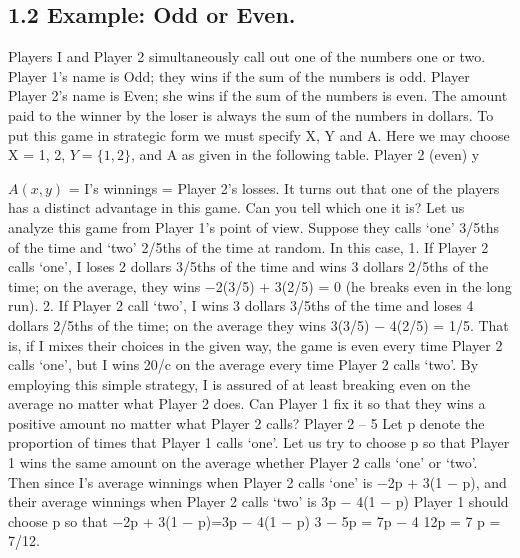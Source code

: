 \documentclass[]{report}
\begin{document}
\subsection{1.2 Example: Odd or Even.} Players I and Player 2 simultaneously call out one of the
numbers one or two. Player 1’s name is Odd; they wins if the sum of the numbers is odd.
Player Player 2’s name is Even; she wins if the sum of the numbers is even. The amount paid to
the winner by the loser is always the sum of the numbers in dollars. To put this game in
strategic form we must specify X, Y and A. Here we may choose X = {1, 2}, $Y = \{1, 2\}$,
and A as given in the following table.
Player 2 (even) y


$A(x, y)$ = I’s winnings = Player 2’s losses.
It turns out that one of the players has a distinct advantage in this game. Can you
tell which one it is?
Let us analyze this game from Player 1’s point of view. Suppose they calls ‘one’ 3/5ths
of the time and ‘two’ 2/5ths of the time at random. In this case,
1. If Player 2 calls ‘one’, I loses 2 dollars 3/5ths of the time and wins 3 dollars 2/5ths of the
time; on the average, they wins −2(3/5) + 3(2/5) = 0 (he breaks even in the long run).
2. If Player 2 call ‘two’, I wins 3 dollars 3/5ths of the time and loses 4 dollars 2/5ths of the time;
on the average they wins 3(3/5) − 4(2/5) = 1/5.
That is, if I mixes their choices in the given way, the game is even every time Player 2 calls
‘one’, but I wins 20/c on the average every time Player 2 calls ‘two’. By employing this simple
strategy, I is assured of at least breaking even on the average no matter what Player 2 does. Can
Player 1 fix it so that they wins a positive amount no matter what Player 2 calls?
Player 2 – 5
Let p denote the proportion of times that Player 1 calls ‘one’. Let us try to choose p
so that Player 1 wins the same amount on the average whether Player 2 calls ‘one’ or ‘two’. Then
since I’s average winnings when Player 2 calls ‘one’ is −2p + 3(1 − p), and their average winnings
when Player 2 calls ‘two’ is 3p − 4(1 − p) Player 1 should choose p so that
−2p + 3(1 − p)=3p − 4(1 − p)
3 − 5p = 7p − 4
12p = 7
p = 7/12.
\end{document}

